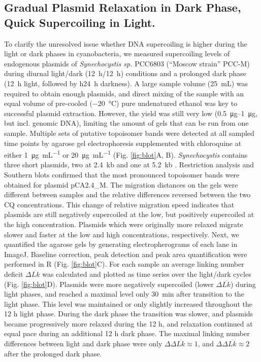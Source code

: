 \documentclass[10pt,a4]{article}
\def\cite#1{\hypersetup{citecolor=Teal}\citep{#1}} %
\newcommand{\ugml}{\micro\gram\per\milli\liter}
\newcommand{\mL}{\milli\liter}
\newcommand{\scyst}{\textit{Synechocystis}}
\begin{document}
\subsection{Gradual Plasmid Relaxation in Dark Phase, Quick Supercoiling in
  Light.}

To clarify the unresolved issue whether DNA supercoiling is higher
during the light or dark phases in cyanobacteria, we measured
supercoiling levels of endogenous plasmids of \textit{Synechocystis
  sp.} PCC6803 (``Moscow strain'' PCC-M) during diurnal light/dark
(\SI{12}{\hour}/\SI{12}{\hour}) conditions and a prolonged dark phase
(\SI{12}{\hour} light, followed by h\SI{24}{\hour} darkness).  A large
sample volume (\SI{25}{\mL}) was required to obtain enough plasmids,
and direct mixing of the sample with an equal volume of pre-cooled
(\SI{-20}{\celsius}) pure undenatured ethanol was key to successful
plasmid extraction. However, the yield was still very low
(\SIrange{0.5}{1}{\ug}, but incl. genomic DNA), limiting the amount of
gels that can be run from one sample.
%
Multiple sets of putative topoisomer bands were detected at all
sampled time points by agarose gel electrophoresis supplemented with
chloroquine at either \SI{1}{\ugml} or \SI{20}{\ugml}
(Fig. \ref{fig:blot}A, B). \scyst{} contains three short plasmids, two
at \SI{2.4}{kb} \cite{Yang1993b, Yang1994} and one at \SI{5.2}{kb}
\cite{Xu1997b}. Restriction analysis and Southern blots confirmed that
the most pronounced topoisomer bands were obtained for plasmid
pCA2.4\_M.
%
The migration distances on the gels were different between samples and
the relative differences reversed between the two CQ
concentrations. This change of relative migration speed indicates that
plasmids are still negatively supercoiled at the low, but positively
supercoiled at the high concentration. Plasmids which were originally
more relaxed migrate slower and faster at the low and high
concentrations, respectively.  
%
Next, we quantified the agarose gels by generating electropherograms
of each lane in ImageJ. Baseline correction, peak detection and peak
area quantification were performed in R (Fig. \ref{fig:blot}C). For
each sample an average linking number deficit $\Delta \overline{Lk}$
was calculated and plotted as time series over the light/dark cycles
(Fig. \ref{fig:blot}D).  Plasmids were more negatively supercoiled
(lower $\Delta \overline{Lk}$) during light phases, and reached a
maximal level only \SI{30}{\minute} after transition to the light
phase. This level was maintained or only slightly increased throughout
the 12 h light phase.  During the dark phase the transition was
slower, and plasmids became progressively more relaxed during the 12
h, and relaxation continued at equal pace during an additional 12 h
dark phase.
%
The maximal linking number differences between light and dark phase
were only $\Delta \Delta \overline{Lk} \approx 1$, and $\Delta \Delta
\overline{Lk} \approx 2$ after the prolonged dark phase.
\end{document}
